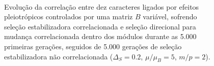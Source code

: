 \begin{figure}[htbp]
    \vspace{-18pt}
    \vspace{11pt}
    \\
    \caption{Evolução da correlação entre dez caracteres ligados por efeitos
        pleiotrópicos controlados por uma matriz $B$ variável, sofrendo
        seleção estabilizadora correlacionada e seleção direcional para
        mudança correlacionada dentro dos módulos durante as 5.000
        primeiras gerações, seguidos de 5.000 gerações de seleção
        estabilizadora não correlacionada ($\Delta_S = 0.2$, $\mu/\mu_B=5$,
    $m/p=2$).}
    \label{posselecaoSemEstab}
\end{figure}



